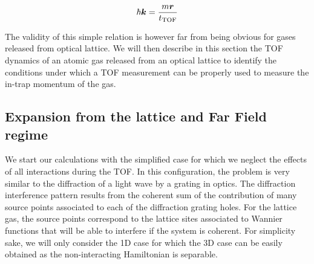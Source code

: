 \begin{equation}
    \hbar \bm{k} = \frac{m \bm{r}}{t_{\rm{TOF}}}
\end{equation}

The validity of this simple relation is however far from being obvious for gases released from optical lattice. We will then describe in this section the TOF dynamics of an atomic gas released from an optical lattice to identify the conditions under which a TOF measurement can be properly used to measure the in-trap momentum of the gas.





\subsection{Expansion from the lattice and Far Field regime}

We start our calculations with the simplified case for which we neglect the effects of all interactions during the TOF. In this configuration, the problem is very similar to the diffraction of a light wave by a grating in optics. The diffraction interference pattern results from the coherent sum of the contribution of many source points associated to each of the diffraction grating holes. For the lattice gas, the source points correspond to the lattice sites associated to Wannier functions that will be able to interfere if the system is coherent. For simplicity sake, we will only consider the 1D case for which the 3D case can be easily obtained as the non-interacting Hamiltonian is separable.


